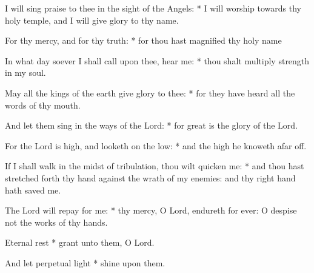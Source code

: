 \item I will sing praise to thee in the sight of the Angels: * I will worship towards thy holy temple, and I will give glory to thy name.
\item  For thy mercy, and for thy truth: * for thou hast magnified thy holy name
\item  In what day soever I shall call upon thee, hear me: * thou shalt multiply strength in my soul.
\item  May all the kings of the earth give glory to thee: * for they have heard all the words of thy mouth.
\item  And let them sing in the ways of the Lord: * for great is the glory of the Lord.
\item  For the Lord is high, and looketh on the low: * and the high he knoweth afar off.
\item  If I shall walk in the midst of tribulation, thou wilt quicken me: * and thou hast stretched forth thy hand against the wrath of my enemies: and thy right hand hath saved me.
\item The Lord will repay for me: * thy mercy, O Lord, endureth for ever: O despise not the works of thy hands.
\item Eternal rest * grant unto them, O Lord.
\item And let perpetual light * shine upon them.
